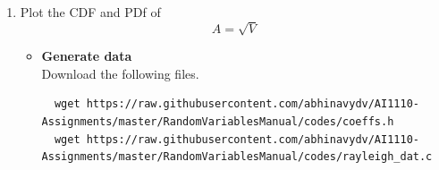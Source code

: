 \documentclass[journal,12pt,twocolumn]{IEEEtran}
\renewcommand\thesection{\arabic{section}}
\begin{document}
\begin{enumerate}[label=\thesection.\arabic*
        ,ref=\thesection.\theenumi]
\begin{align}
                                       & = \int_0^{2\pi} \frac{r}{2\pi} e^{-\frac{r^2}{2}} d\theta                                    \\
                                       & = r e^{-\frac{r^2}{2}}                                                                       \\
              \intertext{CDF is given by,}
              F_R(r)                   & = \int_0^r re^{-\frac{r^2}{2}}  dr                                                           \\
                                       & = 1-e^{-\frac{r^2}{2}}
              \intertext{Since,}
              V                        & = X_1^2 + X_2^2                                                                              \\
                                       & = R^2
              \intertext{Now,}
              F_V(x)                   & = \pr{V\le x}                                                                                \\
                                       & = \pr{R^2 \le x}                                                                             \\
                                       & = \pr{R \le \sqrt{x}}                                                                        \\
              F_V(x)                   & = F_R(\sqrt{x})                                                                              \\
                                       & =\begin{cases}
                  0, & x < 0 \\
                  1 - e^{-\frac{x}{2}},  otherwise
              \end{cases}
              \intertext{Therefore,}
              \alpha                   & = \frac{1}{2}
          \end{align}
    \item
          \label{ch3_raleigh_sim}
          Plot the CDF and PDf of
          \begin{equation}
              A = \sqrt{V}
          \end{equation}
          \solution
          \begin{itemize}
              \item \textbf{Generate data}\\
                    Download the following files.
                    \begin{lstlisting}
  wget https://raw.githubusercontent.com/abhinavydv/AI1110-Assignments/master/RandomVariablesManual/codes/coeffs.h
  wget https://raw.githubusercontent.com/abhinavydv/AI1110-Assignments/master/RandomVariablesManual/codes/rayleigh_dat.c
          \end{lstlisting}


\end{itemize}
\end{enumerate}
\end{document}

